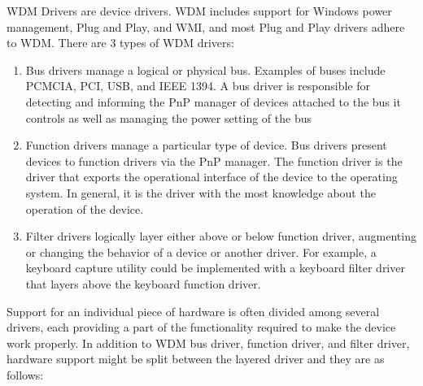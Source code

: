 \documentclass[letterpaper,10pt,draftclsnofoot,onecolumn]{IEEEtran}
\begin{document}
WDM Drivers are device drivers. WDM includes support for Windows power management, Plug and Play, and WMI, and most Plug and Play drivers adhere to WDM. There are 3 types of WDM drivers:\cite{[1]}
\begin{enumerate}
\item Bus drivers manage a logical or physical bus. Examples of buses include PCMCIA, PCI, USB, and IEEE 1394. A bus driver is responsible for detecting and informing the PnP manager of devices attached to the bus it controls as well as managing the power setting of the bus
\item Function drivers manage a particular type of device. Bus drivers present devices to function drivers via the PnP manager. The function driver is the driver that exports the operational interface of the device to the operating system. In general, it is the driver with the most knowledge about the operation of the device.
\item Filter drivers logically layer either above or below function driver, augmenting or changing the behavior of a device or another driver. For example, a keyboard capture utility could be implemented with a keyboard filter driver that layers above the keyboard function driver.
\end{enumerate}
Support for an individual piece of hardware is often divided among several drivers, each providing a part of the functionality required to make the device work properly. In addition to WDM bus driver, function driver, and filter driver, hardware support might be split between the layered driver and they are as follows: \cite{[1]}
\end{document}
